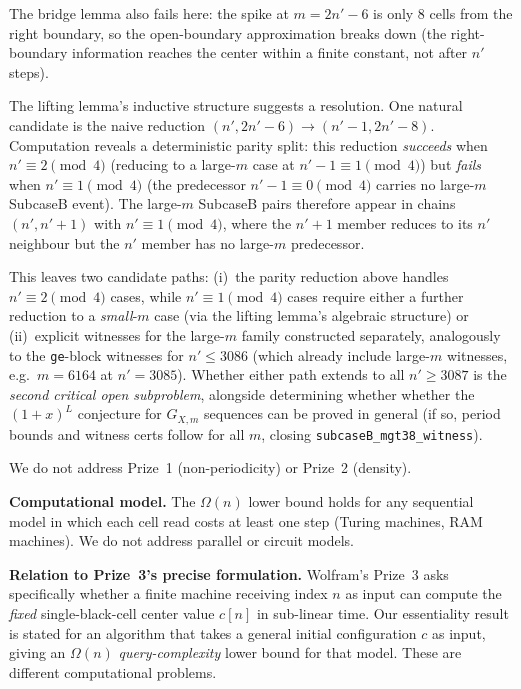 \documentclass[11pt]{article}
\theoremstyle{plain}
\theoremstyle{definition}
\begin{document}
The bridge lemma also fails here: the spike at $m = 2n'{-}6$ is only 8 cells
from the right boundary, so the open-boundary approximation breaks down (the
right-boundary information reaches the center within a finite constant, not
after $n'$ steps).

The lifting lemma's inductive structure suggests a resolution.  One natural
candidate is the naive reduction $(n', 2n'{-}6) \to (n'{-}1, 2n'{-}8)$.
Computation reveals a deterministic parity split: this reduction
\emph{succeeds} when $n' \equiv 2 \pmod{4}$ (reducing to a large-$m$ case at
$n'-1 \equiv 1 \pmod 4$) but \emph{fails} when $n' \equiv 1 \pmod{4}$
(the predecessor $n'{-}1 \equiv 0 \pmod 4$ carries no large-$m$ SubcaseB
event).  The large-$m$ SubcaseB pairs therefore appear in chains
$(n', n'{+}1)$ with $n' \equiv 1 \pmod{4}$, where the $n'{+}1$ member reduces
to its $n'$ neighbour but the $n'$ member has no large-$m$ predecessor.

This leaves two candidate paths: (i)~the parity reduction above handles
$n' \equiv 2 \pmod{4}$ cases, while $n' \equiv 1 \pmod{4}$ cases require
either a further reduction to a \emph{small}-$m$ case (via the lifting
lemma's algebraic structure) or (ii)~explicit witnesses for the
large-$m$ family constructed separately, analogously to the \texttt{ge}-block
witnesses for $n' \leq 3086$ (which already include large-$m$ witnesses, e.g.\
$m = 6164$ at $n' = 3085$).  Whether either path extends to all $n' \geq 3087$
is the \emph{second critical open subproblem}, alongside determining whether
whether the $(1+x)^L$ conjecture for $G_{X,m}$ sequences can be proved in general
(if so, period bounds and witness certs follow for all $m$, closing \texttt{subcaseB\_mgt38\_witness}).

We do not address Prize~1 (non-periodicity) or Prize~2 (density).

\textbf{Computational model.}  The $\Omega(n)$ lower bound holds for any sequential
model in which each cell read costs at least one step (Turing machines, RAM
machines).  We do not address parallel or circuit models.

\textbf{Relation to Prize~3's precise formulation.}
Wolfram's Prize~3 asks specifically whether a finite machine receiving index $n$ as
input can compute the \emph{fixed} single-black-cell center value $c[n]$ in sub-linear
time.  Our essentiality result is stated for an algorithm that takes a general initial
configuration $c$ as input, giving an $\Omega(n)$ \emph{query-complexity} lower bound
for that model.  These are different computational problems.
\end{document}
